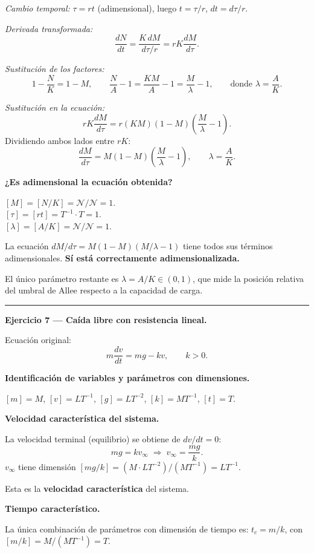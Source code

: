 \documentclass[12pt,letterpaper]{article}
\begin{document}
\emph{Cambio temporal:} $\tau=rt$ (adimensional), luego $t=\tau/r$, $dt=d\tau/r$.

\emph{Derivada transformada:}
\[
  \frac{dN}{dt}=\frac{K\,dM}{d\tau/r}=rK\frac{dM}{d\tau}.
\]

\emph{Sustitución de los factores:}
\[
  1-\frac{N}{K}=1-M,\qquad
  \frac{N}{A}-1=\frac{KM}{A}-1=\frac{M}{\lambda}-1,
  \qquad\text{donde }\lambda=\frac{A}{K}.
\]

\emph{Sustitución en la ecuación:}
\[
  rK\frac{dM}{d\tau}=r(KM)(1-M)\!\left(\frac{M}{\lambda}-1\right).
\]
Dividiendo ambos lados entre $rK$:
\[
  \boxed{\frac{dM}{d\tau}=M(1-M)\!\left(\frac{M}{\lambda}-1\right),
  \qquad\lambda=\frac{A}{K}.}
\]

\textbf{¿Es adimensional la ecuación obtenida?}

$[M]=[N/K]=\mathcal{N}/\mathcal{N}=1$. \checkmark\\
$[\tau]=[rt]=T^{-1}\cdot T=1$. \checkmark\\
$[\lambda]=[A/K]=\mathcal{N}/\mathcal{N}=1$. \checkmark

La ecuación $dM/d\tau=M(1-M)(M/\lambda-1)$ tiene todos sus términos adimensionales.
\textbf{Sí está correctamente adimensionalizada.}

El único parámetro restante es $\lambda=A/K\in(0,1)$, que mide la posición relativa
del umbral de Allee respecto a la capacidad de carga.

\bigskip
\noindent\rule{\textwidth}{0.3pt}
\bigskip

\noindent\textbf{Ejercicio 7 — Caída libre con resistencia lineal.}

Ecuación original:
\[
  m\frac{dv}{dt}=mg-kv,\qquad k>0.
\]

\textbf{Identificación de variables y parámetros con dimensiones.}

$[m]=M$, $[v]=LT^{-1}$, $[g]=LT^{-2}$, $[k]=MT^{-1}$, $[t]=T$.

\textbf{Velocidad característica del sistema.}

La velocidad terminal (equilibrio) se obtiene de $dv/dt=0$:
\[
  mg=kv_\infty
  \;\Longrightarrow\;
  v_\infty=\frac{mg}{k}.
\]
$v_\infty$ tiene dimensión $[mg/k]=(M\cdot LT^{-2})/(MT^{-1})=LT^{-1}$. \checkmark

Esta es la \textbf{velocidad característica} del sistema.

\textbf{Tiempo característico.}

La única combinación de parámetros con dimensión de tiempo es:
$t_c=m/k$, con $[m/k]=M/(MT^{-1})=T$. \checkmark
\end{document}
